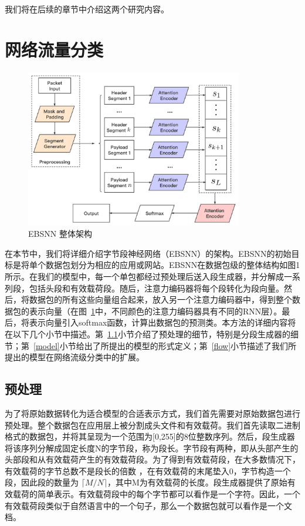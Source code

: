 \documentclass[degree=master,cjk-font=noto]{thuthesis}
\begin{document}
我们将在后续的章节中介绍这两个研究内容。

\section{网络流量分类}

\begin{figure}[!htp]
	\centerline{\includegraphics[width=9.5cm]{Overall_EBSNN.png}}
	\caption{EBSNN 整体架构}
	\label{fig1}
\end{figure}

在本节中，我们将详细介绍字节段神经网络（EBSNN）的架构。EBSNN的初始目标是将单个数据包划分为相应的应用或网站。EBSNN在数据包级的整体结构如图1所示。在我们的模型中，每一个单包都经过预处理后送入段生成器，并分解成一系列段，包括头段和有效载荷段。随后，注意力编码器将每个段转化为段向量。然后，将数据包的所有这些向量组合起来，放入另一个注意力编码器中，得到整个数据包的表示向量（在图~\ref{fig1}中，不同颜色的注意力编码器具有不同的RNN层）。最后，将表示向量引入softmax函数，计算出数据包的预测类。本方法的详细内容将在以下几个小节中描述。第~\ref{prep}小节介绍了预处理的细节，特别是分段生成器的细节；第~\ref{model}小节给出了所提出的模型的形式定义；第~\ref{flow}小节描述了我们所提出的模型在网络流级分类中的扩展。

\subsection{预处理}
\label{prep}

为了将原始数据转化为适合模型的合适表示方式，我们首先需要对原始数据包进行预处理。整个数据包在应用层上被分割成头文件和有效载荷。我们首先读取二进制格式的数据包，并将其呈现为一个范围为[0,255]的8位整数序列。然后，段生成器将该序列分解成固定长度N的字节段，称为段长。字节段有两种，即从头部产生的头部段和从有效载荷产生的有效载荷段。为了得到有效载荷段，在大多数情况下，有效载荷的字节总数不是段长的倍数 ，在有效载荷的末尾垫入0，字节构造一个段，因此段的数量为 $\lceil M / N \rceil$，其中M为有效载荷的长度。段生成器提供了原始有效载荷的简单表示。有效载荷段中的每个字节都可以看作是一个字符。因此，一个有效载荷段类似于自然语言中的一个句子，那么一个数据包就可以看作是一个文档。
\end{document}
